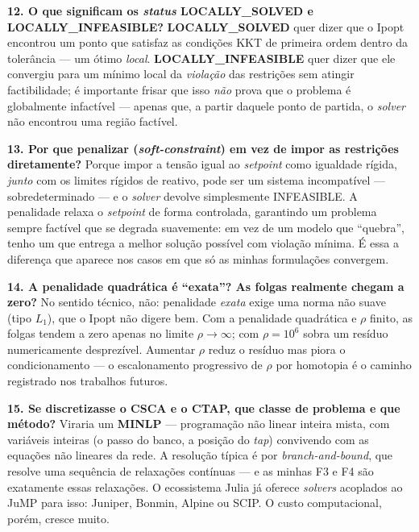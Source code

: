 \documentclass[11pt,a4paper]{article}
\begin{document}
\textbf{12. O que significam os \textit{status} LOCALLY\_SOLVED e LOCALLY\_INFEASIBLE?} \textbf{LOCALLY\_SOLVED} quer dizer que o Ipopt encontrou um ponto que satisfaz as condições KKT de primeira ordem dentro da tolerância --- um ótimo \emph{local}. \textbf{LOCALLY\_INFEASIBLE} quer dizer que ele convergiu para um mínimo local da \emph{violação} das restrições sem atingir factibilidade; é importante frisar que isso \emph{não} prova que o problema é globalmente infactível --- apenas que, a partir daquele ponto de partida, o \textit{solver} não encontrou uma região factível.

\textbf{13. Por que penalizar (\textit{soft-constraint}) em vez de impor as restrições diretamente?} Porque impor a tensão igual ao \textit{setpoint} como igualdade rígida, \emph{junto} com os limites rígidos de reativo, pode ser um sistema incompatível --- sobredeterminado --- e o \textit{solver} devolve simplesmente INFEASIBLE. A penalidade relaxa o \textit{setpoint} de forma controlada, garantindo um problema sempre factível que se degrada suavemente: em vez de um modelo que ``quebra'', tenho um que entrega a melhor solução possível com violação mínima. É essa a diferença que aparece nos casos em que só as minhas formulações convergem.

\textbf{14. A penalidade quadrática é ``exata''? As folgas realmente chegam a zero?} No sentido técnico, não: penalidade \emph{exata} exige uma norma não suave (tipo $L_1$), que o Ipopt não digere bem. Com a penalidade quadrática e $\rho$ finito, as folgas tendem a zero apenas no limite $\rho \to \infty$; com $\rho = 10^6$ sobra um resíduo numericamente desprezível. Aumentar $\rho$ reduz o resíduo mas piora o condicionamento --- o escalonamento progressivo de $\rho$ por homotopia é o caminho registrado nos trabalhos futuros.

\textbf{15. Se discretizasse o CSCA e o CTAP, que classe de problema e que método?} Viraria um \textbf{MINLP} --- programação não linear inteira mista, com variáveis inteiras (o passo do banco, a posição do \textit{tap}) convivendo com as equações não lineares da rede. A resolução típica é por \textit{branch-and-bound}, que resolve uma sequência de relaxações contínuas --- e as minhas F3 e F4 são exatamente essas relaxações. O ecossistema Julia já oferece \textit{solvers} acoplados ao JuMP para isso: Juniper, Bonmin, Alpine ou SCIP. O custo computacional, porém, cresce muito.
\end{document}
